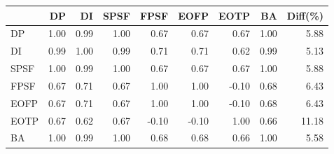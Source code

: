 \begin{tabular}{l|rrrrrrr|r}
\toprule
 & DP & DI & SPSF & FPSF & EOFP & EOTP & BA & Diff(\%)  \\
\midrule
DP & 1.00 & 0.99 & 1.00 & 0.67 & 0.67 & 0.67 & 1.00 & 5.88  \\
DI & 0.99 & 1.00 & 0.99 & 0.71 & 0.71 & 0.62 & 0.99 & 5.13  \\
SPSF & 1.00 & 0.99 & 1.00 & 0.67 & 0.67 & 0.67 & 1.00 & 5.88  \\
FPSF & 0.67 & 0.71 & 0.67 & 1.00 & 1.00 & -0.10 & 0.68 & 6.43  \\
EOFP & 0.67 & 0.71 & 0.67 & 1.00 & 1.00 & -0.10 & 0.68 & 6.43  \\
EOTP & 0.67 & 0.62 & 0.67 & -0.10 & -0.10 & 1.00 & 0.66 & 11.18  \\
BA & 1.00 & 0.99 & 1.00 & 0.68 & 0.68 & 0.66 & 1.00 & 5.58  \\
\bottomrule
\end{tabular}

